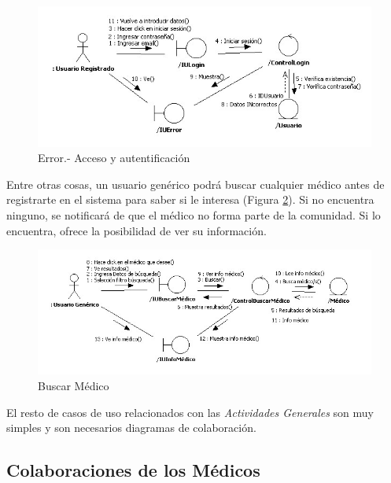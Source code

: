 \documentclass[a4paper,oneside,11pt]{book}
\begin{document}
			\begin{figure}[H]
			  \centering
			    \includegraphics[width=16cm]{img/jpg/colaboraciones/24_AccesoyautentificacionError.jpg}
			  \caption{Error.- Acceso y autentificación}
			  \label{fig:col_acc_y_aut_err}
			\end{figure}
			
			Entre otras cosas, un usuario genérico podrá buscar cualquier médico antes de registrarte en el sistema para saber si le interesa (Figura \ref{fig:col_buscarmedico}). Si no encuentra ninguno, se notificará de que el médico no forma parte de la comunidad. Si lo encuentra, ofrece la posibilidad de ver su información.
			
			\begin{figure}[H]
			  \centering
			    \includegraphics[width=16cm]{img/jpg/colaboraciones/22_BuscarMedico.jpg}
			  \caption{Buscar Médico}
			  \label{fig:col_buscarmedico}
			\end{figure}
			
			El resto de casos de uso relacionados con las \textit{Actividades Generales} son muy simples y son necesarios diagramas de colaboración.
			
		
		\newpage
		\subsection{Colaboraciones de los Médicos} %
		\label{sub:colaboraciones_de_los_medicos}
		
\end{document}
